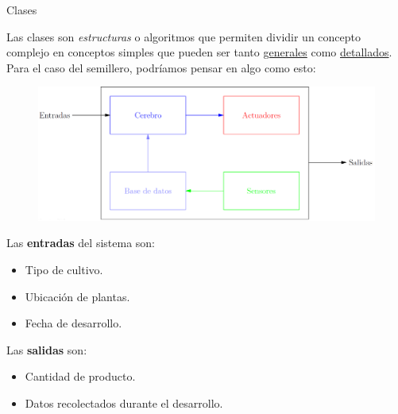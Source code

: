 \begin{frame}[allowframebreaks]{Clases}\vspace{0pt}

Las clases son \textit{estructuras} o algoritmos que permiten dividir un concepto complejo en conceptos simples que pueden ser tanto \underline{generales} como \underline{detallados}. Para el caso del semillero, podríamos pensar en algo como esto:

\begin{figure}
	\includegraphics[scale=0.35]{Images/Esquema/Esquema.PNG}
\end{figure}

\vspace{30pt}

Las \textbf{entradas} del sistema son:

\begin{itemize}
	\item Tipo de cultivo.
	\item Ubicación de plantas.
	\item Fecha de desarrollo.
\end{itemize}

Las \textbf{salidas} son:

\begin{itemize}
	\item Cantidad de producto.
	\item Datos recolectados durante el desarrollo.
\end{itemize}

\end{frame}